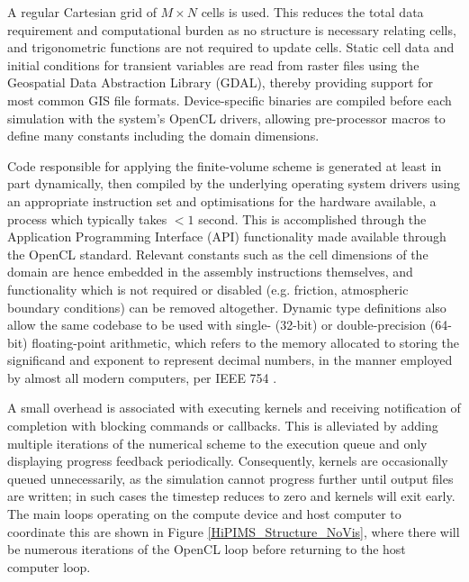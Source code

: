 A regular Cartesian grid of \(M \times N\) cells is used. This reduces the total data requirement and computational burden as no structure is necessary relating cells, and trigonometric functions are not required to update cells. Static cell data and initial conditions for transient variables are read from raster files using the Geospatial Data Abstraction Library (GDAL), thereby providing support for most common GIS file formats. Device-specific binaries are compiled before each simulation with the system's OpenCL drivers, allowing pre-processor macros to define many constants including the domain dimensions. 

Code responsible for applying the finite-volume scheme is generated at least in part dynamically, then compiled by the underlying operating system drivers using an appropriate instruction set and optimisations for the hardware available, a process which typically takes $<1$ second. This is accomplished through the Application Programming Interface (API) functionality made available through the OpenCL standard. Relevant constants such as the cell dimensions of the domain are hence embedded in the assembly instructions themselves, and functionality which is not required or disabled (e.g. friction, atmospheric boundary conditions) can be removed altogether. Dynamic type definitions also allow the same codebase to be used with single- (32-bit) or double-precision (64-bit) floating-point arithmetic, which refers to the memory allocated to storing the significand and exponent to represent decimal numbers, in the manner employed by almost all modern computers, per IEEE 754 \citep{InternationalOrganizationforStandardization2011}.

A small overhead is associated with executing kernels and receiving notification of completion with blocking commands or callbacks. This is alleviated by adding multiple iterations of the numerical scheme to the execution queue and only displaying progress feedback periodically. Consequently, kernels are occasionally queued unnecessarily, as the simulation cannot progress further until output files are written; in such cases the timestep reduces to zero and kernels will exit early. The main loops operating on the compute device and host computer to coordinate this are shown in Figure \ref{HiPIMS_Structure_NoVis}, where there will be numerous iterations of the OpenCL loop before returning to the host computer loop.

